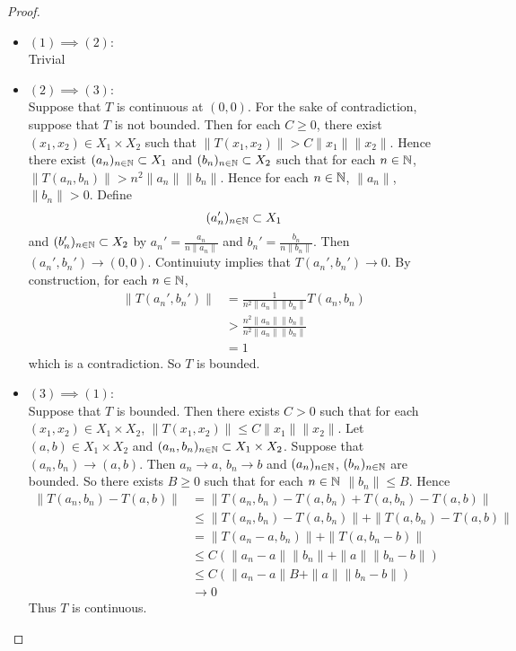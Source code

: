 \documentclass{book}
\begin{document}
	\begin{proof}\
		\begin{itemize}
		\item $(1) \implies (2)$:\\
		Trivial
		\item  $(2) \implies (3)$:\\ 
		Suppose that $T$ is continuous at $(0, 0)$. For the sake of contradiction, suppose that $T$ is not bounded. Then for each $C \geq 0$, there exist $(x_1, x_2) \in X_1 \times X_2$ such that $\|T(x_1, x_2)\| > C\|x_1\| \|x_2\|$. Hence there exist $(a_n)_{n \in \mathbb{N}} \subset X_1$ and $(b_n)_{n \in \mathbb{N}} \subset X_2$ such that for each $n \in \mathbb{N}$, $ \| T(a_n, b_n) \| > n^2 \|a_n\| \|b_n\|$. Hence for each $n \in \mathbb{N}$, $\|a_n\|$, $\|b_n\| > 0$. Define $$(a'_n)_{n \in \mathbb{N}} \subset X_1$$ and $(b'_n)_{n \in \mathbb{N}} \subset X_2$ by $a_n' = \frac{a_n}{n\|a_n\|}$ and $b_n' = \frac{b_n}{n\|b_n\|}$. Then $(a_n', b_n') \rightarrow (0,0)$. Continuiuty implies that $T(a_n',b_n') \rightarrow 0$. By construction, for each $n \in \mathbb{N}$,
		\begin{align*}
		\|T(a_n',b_n')\| 
		&= \frac{1}{n^2 \|a_n\| \|b_n\|} T(a_n, b_n) \\
		& > \frac{n^2 \|a_n\| \|b_n\|}{n^2 \|a_n\| \|b_n\|} \\
		&= 1
		\end{align*}
		which is a contradiction. So $T$ is bounded.
		\item  $(3) \implies (1)$:\\ 
		Suppose that $T$ is bounded. Then there exists $C > 0$ such that for each $(x_1, x_2) \in X_1 \times X_2$, $\| T(x_1, x_2) \| \leq C\|x_1\| \|x_2\|$. Let $(a, b) \in X_1 \times X_2$ and $(a_n, b_n)_{n \in \mathbb{N}} \subset X_1 \times X_2$. Suppose that $(a_n, b_n) \rightarrow (a,b)$. Then $a_n \rightarrow a$, $b_n \rightarrow b$ and $(a_n)_{n \in \mathbb{N}}$, $(b_n)_{n \in \mathbb{N}}$ are bounded. So there exists $B \geq 0$ such that for each $n \in \mathbb{N}$ $\|b_n\| \leq B$. Hence 
		\begin{align*}
		\|T(a_n,b_n) - T(a,b) \|
		&= \|T(a_n,b_n) - T(a, b_n) + T(a, b_n) - T(a,b) \| \\
		& \leq \|T(a_n,b_n) - T(a, b_n) \| + \|T(a, b_n) - T(a,b) \| \\
		&= \|T(a_n - a,b_n) \| + \|T(a, b_n - b)\| \\
		& \leq C(\|a_n - a\| \|b_n\| + \|a\|\|b_n - b\|) \\
		& \leq C(\|a_n - a\| B + \|a\|\|b_n - b\|) \\
		& \rightarrow 0
		\end{align*}
		Thus $T$ is continuous. 
		\end{itemize}
	\end{proof}
	
\end{document}
